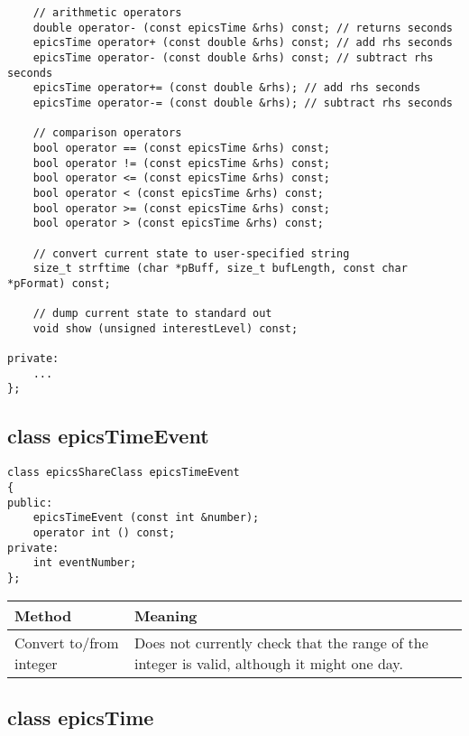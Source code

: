 \begin{verbatim}
    // arithmetic operators
    double operator- (const epicsTime &rhs) const; // returns seconds
    epicsTime operator+ (const double &rhs) const; // add rhs seconds
    epicsTime operator- (const double &rhs) const; // subtract rhs seconds
    epicsTime operator+= (const double &rhs); // add rhs seconds
    epicsTime operator-= (const double &rhs); // subtract rhs seconds

    // comparison operators
    bool operator == (const epicsTime &rhs) const;
    bool operator != (const epicsTime &rhs) const;
    bool operator <= (const epicsTime &rhs) const;
    bool operator < (const epicsTime &rhs) const;
    bool operator >= (const epicsTime &rhs) const;
    bool operator > (const epicsTime &rhs) const;

    // convert current state to user-specified string
    size_t strftime (char *pBuff, size_t bufLength, const char *pFormat) const;

    // dump current state to standard out
    void show (unsigned interestLevel) const;

private:
    ...
};
\end{verbatim}

\subsection{class epicsTimeEvent}

\begin{verbatim}
class epicsShareClass epicsTimeEvent
{
public:
    epicsTimeEvent (const int &number);
    operator int () const;
private:
    int eventNumber;
};
\end{verbatim}
\begin{center}
\begin{longtable}{p{1.79167in}p{4.94833in}}
\textbf{Method} & \textbf{Meaning}\\
\hline
Convert to/from integer & Does not currently check that the range of the integer is valid, although it might one day.
\end{longtable}

\end{center}


\subsection{class epicsTime}

